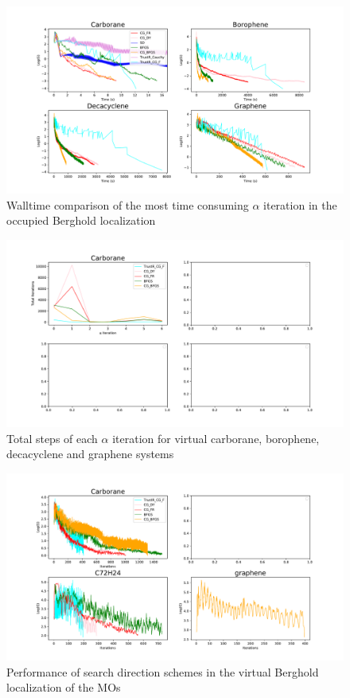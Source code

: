 \documentclass[aps,prl,reprint,amsmath,amssymb]{revtex4-1}
\begin{document}
\begin{figure}[htb]
\centering
\includegraphics[width=\textwidth]{occupied_walltime.pdf}
\caption{Walltime comparison of the most time consuming $\alpha$ iteration in the occupied Berghold localization}
\label{fig:occ_walltime}
\end{figure}


\begin{figure}[htb]
\centering
\includegraphics[width=\textwidth]{virtual_iter.pdf}
\caption{Total steps of each $\alpha$ iteration for virtual carborane, borophene, decacyclene and graphene systems}
\label{fig:vir_iter}
\end{figure}

\begin{figure}[htb]
\centering
\includegraphics[width=\textwidth]{virtual_grad.pdf}
\caption{Performance of search direction schemes in the virtual Berghold localization of the MOs}
\label{fig:vir_grad}
\end{figure}
\end{document}
